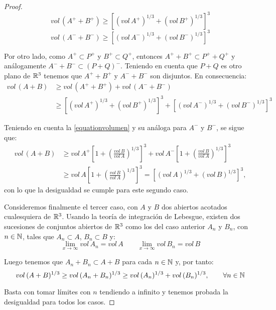 \begin{proof}
\begin{equation*}
    vol \, (A^+ + B^+) \geq \left[ (vol \, A^+)^{1/3} + (vol \, B^+)^{1/3} \right]^3
\end{equation*}
\begin{equation*}
    vol \, (A^- + B^-) \geq \left[ (vol \, A^-)^{1/3} + (vol \, B^-)^{1/3} \right]^3
\end{equation*}

Por otro lado, como $A^+ \subset P^+$ y $B^+ \subset Q^+$, entonces $A^+ + B^+ \subset P^+ + Q^+$ y análogamente $A^- + B^- \subset (P+Q)^-$. Teniendo en cuenta que $P+Q$ es otro plano de $\mathbb{R}^3$ tenemos que $A^+ + B^+$ y $A^- + B^-$ son disjuntos. En consecuencia:
%
\begin{align*}
    vol \, (A+B) &\geq vol \,(A^+ + B^+) + vol \,(A^- + B^-) \\ 
    &\geq \left[ (vol \, A^+)^{1/3} + (vol \, B^+)^{1/3} \right]^3 + \left[ (vol \, A^-)^{1/3} + (vol \, B^-)^{1/3} \right]^3
\end{align*}

Teniendo en cuenta la \ref{equationvolumen} y su análoga para $A^-$ y $B^-$, se sigue que:
%
\begin{align*}
    vol \, (A+B) &\geq vol \, A^+ \left[ 1 + \left( \frac{vol \, B}{vol \, A} \right)^{1/3}  \right]^3 + vol \, A^- \left[ 1 + \left( \frac{vol \, B}{vol \, A} \right)^{1/3}  \right]^3 \\
    &\geq vol \, A \left[ 1 + \left( \frac{vol \, B}{vol \, A} \right)^{1/3}  \right]^3 = \left[ (vol \, A)^{1/3} + (vol \, B)^{1/3} \right]^3,
\end{align*}
%
con lo que la desigualdad se cumple para este segundo caso.

Consideremos finalmente el tercer caso, con $A$ y $B$ dos abiertos acotados cualesquiera de $\mathbb{R}^3$. Usando la teoría de integración de Lebesgue, existen dos sucesiones de conjuntos abiertos de $\mathbb{R}^3$ como los del caso anterior $A_n$ y $B_n$, con $n \in \mathbb{N}$, tales que $A_n \subset A$, $B_n \subset B$ y:
%
\begin{equation*}
    \lim_{x \to \infty} vol \, A_n = vol \, A \qquad \lim_{x \to \infty} vol \, B_n = vol \, B
\end{equation*}

Luego tenemos que $A_n + B_n \subset A + B$ para cada $n \in \mathbb{N}$ y, por tanto:
%
\begin{equation*}
    vol \, (A+B)^{1/3} \geq vol \, (A_n+B_n)^{1/3} \geq vol \, (A_n) ^{1/3} + vol \, (B_n)^{1/3}, \qquad \forall n \in \mathbb{N}
\end{equation*}

Basta con tomar límites con $n$ tendiendo a infinito y tenemos probada la desigualdad para todos los casos.
\end{proof}

